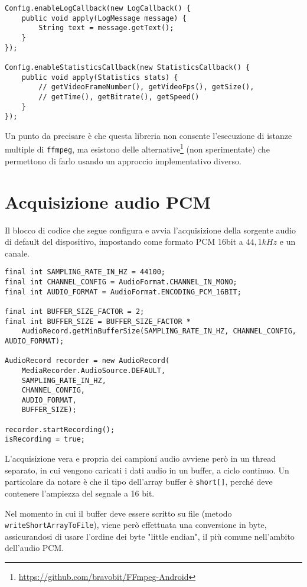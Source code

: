 \begin{verbatim}
Config.enableLogCallback(new LogCallback() {
    public void apply(LogMessage message) {
        String text = message.getText();
    }
});

Config.enableStatisticsCallback(new StatisticsCallback() {
    public void apply(Statistics stats) {
        // getVideoFrameNumber(), getVideoFps(), getSize(),
        // getTime(), getBitrate(), getSpeed()
    }
});
\end{verbatim}

Un punto da precisare è che questa libreria non consente l'esecuzione di istanze multiple di \texttt{ffmpeg}, ma esistono delle alternative\footnote{\url{https://github.com/bravobit/FFmpeg-Android}} (non sperimentate) che permettono di farlo usando un approccio implementativo diverso.

\chapter{Acquisizione audio PCM}
\label{cha:allegato_pcm}

Il blocco di codice che segue configura e avvia l'acquisizione della sorgente audio di default del dispositivo, impostando come formato PCM 16bit a $44,1 kHz$ e un canale.

\begin{verbatim}
final int SAMPLING_RATE_IN_HZ = 44100;
final int CHANNEL_CONFIG = AudioFormat.CHANNEL_IN_MONO;
final int AUDIO_FORMAT = AudioFormat.ENCODING_PCM_16BIT;

final int BUFFER_SIZE_FACTOR = 2;
final int BUFFER_SIZE = BUFFER_SIZE_FACTOR *
    AudioRecord.getMinBufferSize(SAMPLING_RATE_IN_HZ, CHANNEL_CONFIG, AUDIO_FORMAT);

AudioRecord recorder = new AudioRecord(
    MediaRecorder.AudioSource.DEFAULT,
    SAMPLING_RATE_IN_HZ,
    CHANNEL_CONFIG,
    AUDIO_FORMAT,
    BUFFER_SIZE);

recorder.startRecording();
isRecording = true;
\end{verbatim}

L'acquisizione vera e propria dei campioni audio avviene però in un thread separato, in cui vengono caricati i dati audio in un buffer, a ciclo continuo. Un particolare da notare è che il tipo dell'array buffer è \texttt{short[]}, perché deve contenere l'ampiezza del segnale a 16 bit.

Nel momento in cui il buffer deve essere scritto su file (metodo \texttt{writeShortArrayToFile}), viene però effettuata una conversione in byte, assicurandosi di usare l'ordine dei byte "little endian", il più comune nell'ambito dell'audio PCM.

